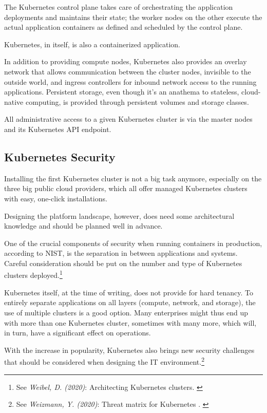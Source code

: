 The Kubernetes control plane takes care of orchestrating the application deployments and maintains their state; the worker nodes on the other execute the actual application containers as defined and scheduled by the control plane.

Kubernetes, in itself, is also a containerized application.

In addition to providing compute nodes, Kubernetes also provides an overlay network that allows communication between the cluster nodes, invisible to the outside world, and ingress controllers for inbound network access to the running applications. Persistent storage, even though it's an anathema to stateless, cloud-native computing, is provided through persistent volumes and storage classes.

All administrative access to a given Kubernetes cluster is via the master nodes and its Kubernetes API endpoint.

\subsection{Kubernetes Security}

Installing the first Kubernetes cluster is not a big task anymore, especially on the three big public cloud providers, which all offer managed Kubernetes clusters with easy, one-click installations.

Designing the platform landscape, however, does need some architectural knowledge and should be planned well in advance.

One of the crucial components of security when running containers in production, according to NIST, is the separation in between applications and systems. Careful consideration should be put on the number and type of Kubernetes clusters deployed.\footnote{See \textit{Weibel, D. (2020)}: Architecting Kubernetes clusters. \cite{howMany}}

Kubernetes itself, at the time of writing, does not provide for hard tenancy. To entirely separate applications on all layers (compute, network, and storage), the use of multiple clusters is a good option. Many enterprises might thus end up with more than one Kubernetes cluster, sometimes with many more, which will, in turn, have a significant effect on operations.

With the increase in popularity, Kubernetes also brings new security challenges that should be considered when designing the IT environment.\footnote{See \textit{Weizmann, Y. (2020)}: Threat matrix for Kubernetes . \cite{threatMatrix}}

